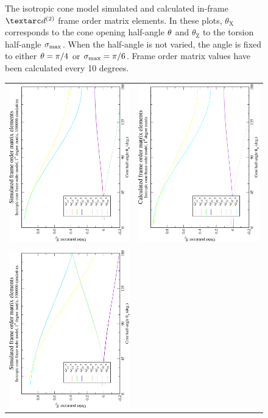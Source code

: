 \begin{figure}
\begin{tabular}{@{}cc@{}}
  \end{tabular}
  \caption[Isotropic cone simulated and calculated in-frame Daeg$^{(2)}$ elements.]{
    The isotropic cone model simulated and calculated in-frame $\FOtwo$ frame order matrix elements.
    In these plots, $\theta_\textrm{X}$ corresponds to the cone opening half-angle $\theta$ and $\theta_\textrm{Z}$ to the torsion half-angle $\sigma_\textrm{max}$.
    When the half-angle is not varied, the angle is fixed to either $\theta = \pi/4$ or $\sigma_\textrm{max} = \pi/6$.
    Frame order matrix values have been calculated every 10 degrees.
  }
  \label{fig: simulated and calculated in-frame 2nd degree iso cone frame order}
\end{figure}

\begin{figure}
\centering
  \begin{tabular}{@{}cc@{}}
    \includegraphics[width=.35\textwidth,angle=270]{images/frame_order_matrix/Sij_iso_cone_out_of_frame_theta_x_ens1000000.eps} &
    \includegraphics[width=.35\textwidth,angle=270]{images/frame_order_matrix/Sij_iso_cone_out_of_frame_theta_x_calc.eps} \\
    \\[-5pt]
    \includegraphics[width=.35\textwidth,angle=270]{images/frame_order_matrix/Sij_iso_cone_out_of_frame_theta_z_ens1000000.eps} &

\end{tabular}
\end{figure}
